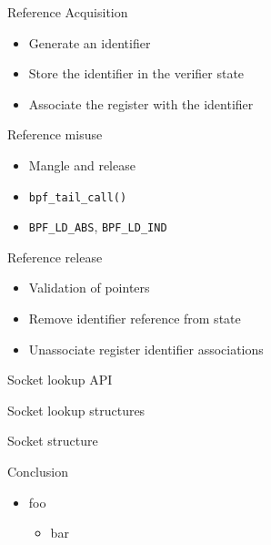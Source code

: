\documentclass[black,white]{beamer}
\begin{document}
    \begin{frame}{Reference Acquisition}
        \begin{itemize}
            \item Generate an identifier \medskip
            \item Store the identifier in the verifier state \medskip
            \item Associate the register with the identifier \medskip
        \end{itemize}
    \end{frame}

    \begin{frame}[fragile]{Reference misuse}
        \begin{itemize}
            \item Mangle and release \medskip
            \item \verb+bpf_tail_call()+ \medskip
            \item \verb+BPF_LD_ABS+, \verb+BPF_LD_IND+ \medskip
        \end{itemize}
    \end{frame}

    \begin{frame}{Reference release}
        \begin{itemize}
            \item Validation of pointers \medskip
            \item Remove identifier reference from state \medskip
            \item Unassociate register identifier associations \medskip
        \end{itemize}
    \end{frame}

    \begin{frame}[fragile]{Socket lookup API}
        
    \end{frame}

    \begin{frame}[fragile]{Socket lookup structures}
        
    \end{frame}

    \begin{frame}[fragile]{Socket structure}
        
    \end{frame}

    \begin{frame}{Conclusion}
        \begin{itemize}
            \item foo \smallskip
            \begin{itemize}
                \item bar \medskip
            \end{itemize}
        \end{itemize}
    \end{frame}
\end{document}
